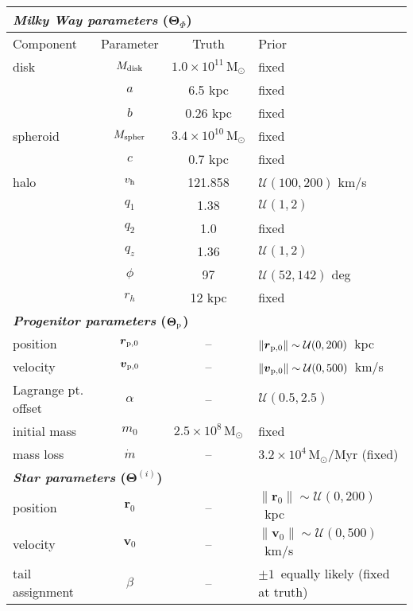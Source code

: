 \documentclass{emulateapj}
\newcommand{\msun}{\mathrm{M}_\odot}
\newcommand{\bs}{\boldsymbol}
\newcommand{\sat}{{\rm p}}
\newcommand{\vhalo}{v_{\rm h}}
\begin{document}
\begin{table*}[ht]
\begin{center}
	\begin{tabular}{l c c l} \toprule
		\multicolumn{4}{l}{{\bf \emph{Milky Way parameters} ($\bs{\Theta}_\Phi$)}} \\
		\toprule
		Component & Parameter & Truth & Prior \\\toprule
		disk & $M_{\rm disk}$ & $1.0\times10^{11}\,\msun$ & fixed \\ 
		& $a$ & 6.5 kpc & fixed\\
		& $b$ & 0.26 kpc & fixed\\
		\midrule
		spheroid & $M_{\rm spher}$ & $3.4\times10^{10}\,\msun$ & fixed\\ 
		& $c$ & 0.7 kpc & fixed\\
		\midrule
		halo & $\vhalo$ & 121.858 & $\mathcal{U}(100,200)$ km/s \\
		& $q_1$ & 1.38 & $\mathcal{U}(1,2)$\\
		& $q_2$ & 1.0 & fixed\\
		& $q_z$ & 1.36 & $\mathcal{U}(1,2)$\\
		& $\phi$ & 97 & $\mathcal{U}(52,142)$ deg\\
		& $r_h$ & 12 kpc & fixed\\
		\toprule
		\multicolumn{4}{l}{{\bf \emph{Progenitor parameters} ($\bs{\Theta}_\sat$)}} \\
		\toprule
		position & $\bs{r}_{\sat,0}$ & -- & $\|\bs{r}_{\sat,0}\|\sim\mathcal{U}(0,200)$~kpc \\
		velocity & $\bs{v}_{\sat,0}$ & -- & $\|\bs{v}_{\sat,0}\|\sim\mathcal{U}(0,500)$~km/s\\
		Lagrange pt. offset & $\alpha$ & -- & $\mathcal{U}(0.5, 2.5)$\\
		initial mass & $m_0$ & $2.5\times10^8\,\msun$ & fixed\\
		mass loss & $\dot{m}$ & -- & $3.2\times10^4\,\msun$/Myr (fixed)\\
		\toprule
		\multicolumn{4}{l}{{\bf \emph{Star parameters} ($\bs{\Theta}^{(i)}$)}} \\
		\toprule
		position & $\bs{r}_0$ & -- & $\|\bs{r}_0\|\sim\mathcal{U}(0,200)$~kpc \\
		velocity & $\bs{v}_0$ & -- & $\|\bs{v}_0\|\sim\mathcal{U}(0,500)$~km/s\\
		tail assignment & $\beta$ & -- & $\pm1$~equally likely (fixed at truth)\\ 
		\bottomrule
		\end{tabular}

\end{center}
\end{table*}
\end{document}

